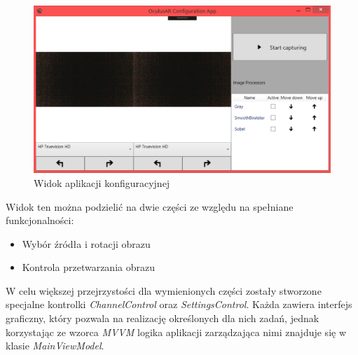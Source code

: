 \documentclass[a4paper,11pt,twoside]{report}
\theoremstyle{definition}
\begin{document}
\begin{figure}[h]
\centering
\includegraphics[scale=0.4]{images/mainwindow_screen}
\caption[Widok aplikacji]{Widok aplikacji konfiguracyjnej}
\end{figure}

Widok ten można podzielić na dwie części ze względu na spełniane funkcjonalności:
\begin{itemize}
\item Wybór źródła i rotacji obrazu
\item Kontrola przetwarzania obrazu
\end{itemize}

W celu większej przejrzystości dla wymienionych części zostały stworzone specjalne kontrolki \textit{ChannelControl} oraz \textit{SettingsControl}. Każda zawiera interfejs graficzny, który pozwala na realizację określonych dla nich zadań, jednak korzystając ze wzorca \textit{MVVM} logika aplikacji zarządzająca nimi znajduje się w klasie \textit{MainViewModel}. 
\end{document}

